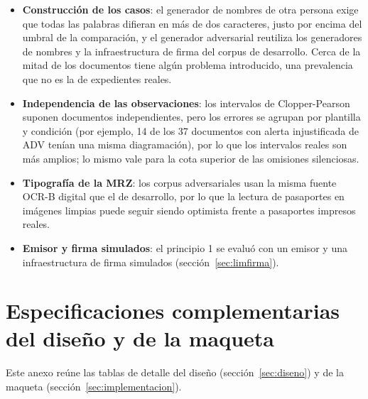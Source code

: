 \documentclass[11pt,a4paper]{article}
\begin{document}
\begin{itemize}
  \item \textbf{Construcción de los casos}: el generador de nombres de otra persona exige que todas las palabras difieran en más de dos caracteres, justo por encima del umbral de la comparación, y el generador adversarial reutiliza los generadores de nombres y la infraestructura de firma del corpus de desarrollo. Cerca de la mitad de los documentos tiene algún problema introducido, una prevalencia que no es la de expedientes reales.
  \item \textbf{Independencia de las observaciones}: los intervalos de Clopper-Pearson suponen documentos independientes, pero los errores se agrupan por plantilla y condición (por ejemplo, 14 de los 37 documentos con alerta injustificada de ADV tenían una misma diagramación), por lo que los intervalos reales son más amplios; lo mismo vale para la cota superior de las omisiones silenciosas.
  \item \textbf{Tipografía de la MRZ}: los corpus adversariales usan la misma fuente OCR-B digital que el de desarrollo, por lo que la lectura de pasaportes en imágenes limpias puede seguir siendo optimista frente a pasaportes impresos reales.
  \item \textbf{Emisor y firma simulados}: el principio 1 se evaluó con un emisor y una infraestructura de firma simulados (sección~\ref{sec:limfirma}).
\end{itemize}

\section{Especificaciones complementarias del diseño y de la maqueta}
\label{sec:anexob}
Este anexo reúne las tablas de detalle del diseño (sección~\ref{sec:diseno}) y de la maqueta (sección~\ref{sec:implementacion}).
\end{document}
